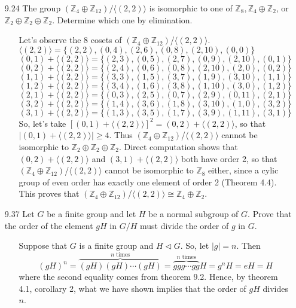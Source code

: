 \documentclass[12pt]{article}
\begin{document}
\begin{enumerate}
\item[9.24] The group $(\mathbb{Z}_4 \oplus \mathbb{Z}_{12})/\langle (2, 2)\rangle$ is isomorphic
to one of $\mathbb{Z}_8, \mathbb{Z}_4 \oplus \mathbb{Z}_2$, or $\mathbb{Z}_2 \oplus \mathbb{Z}_2
\oplus \mathbb{Z}_2$. Determine which one by elimination.
\begin{enumerate}
\item[] Let's observe the 8 cosets of $(\mathbb{Z}_4 \oplus \mathbb{Z}_{12})$/$\langle(2, 2)\rangle$. \\
$\langle(2, 2)\rangle = \{ (2, 2), (0, 4), (2, 6), (0, 8), (2, 10), (0, 0) \}$\\
$(0, 1) + \langle(2, 2)\rangle = \{ (2, 3), (0, 5), (2, 7), (0, 9), (2, 10), (0, 1) \}$\\
$(0, 2) + \langle(2, 2)\rangle = \{ (2, 4), (0, 6), (0, 8), (2, 10), (2, 0), (0, 2) \}$\\
$(1, 1) + \langle(2, 2)\rangle = \{ (3, 3), (1, 5), (3, 7), (1, 9), (3, 10), (1, 1) \}$\\
$(1, 2) + \langle(2, 2)\rangle = \{ (3, 4), (1, 6), (3, 8), (1, 10), (3, 0), (1, 2) \}$\\
$(2, 1) + \langle(2, 2)\rangle = \{ (0, 3), (2, 5), (0, 7), (2, 9), (0, 11), (2, 1) \}$\\
$(3, 2) + \langle(2, 2)\rangle = \{ (1, 4), (3, 6), (1, 8), (3, 10), (1, 0), (3, 2) \}$\\
$(3, 1) + \langle(2, 2)\rangle = \{ (1, 3), (3, 5), (1, 7), (3, 9), (1, 11), (3, 1) \}$ \\
So, let's take $[(0, 1) + \langle(2, 2)\rangle]^2 = (0, 2) + \langle(2, 2)\rangle$, so that 
$|(0, 1) + \langle(2, 2)\rangle| \geq 4$. Thus $(\mathbb{Z}_4 \oplus \mathbb{Z}_{12})$/$\langle(2, 2)\rangle$
cannot be isomorphic to $\mathbb{Z}_2 \oplus \mathbb{Z}_2 \oplus \mathbb{Z}_2$. Direct computation shows
that $(0, 2) + \langle(2, 2)\rangle$ and $(3, 1) + \langle(2, 2)\rangle$ both have order 2, so that
$(\mathbb{Z}_4 \oplus \mathbb{Z}_{12})$/$\langle(2, 2)\rangle$ cannot be isomorphic to $\mathbb{Z}_8$ 
either, since a cylic group of even order has exactly one element of order 2 (Theorem 4.4). This
proves that $(\mathbb{Z}_4 \oplus \mathbb{Z}_{12})$/$\langle(2, 2)\rangle \cong \mathbb{Z}_4 
\oplus \mathbb{Z}_2$.
\end{enumerate}

\item[9.37] Let $G$ be a finite group and let $H$ be a normal subgroup of $G$. Prove that
the order of the element $gH$ in $G/H$ must divide the order of $g$ in $G$.
\begin{enumerate}
\item[] Suppose that $G$ is a finite group and $H \lhd G$. So, let $|g| = n$. Then
\[
(gH)^n = \overbrace{(gH)(gH)\cdots(gH)}^{\mbox{$n$ times}} = 
\overbrace{ggg\cdots gg}^{\mbox{$n$ times}}H = g^nH = eH = H
\]
where the second equality comes from theorem 9.2. Hence, by theorem 4.1, corollary 2, 
what we have shown implies that the order of $gH$ divides $n$.
\end{enumerate}


\end{enumerate}
\end{document}
